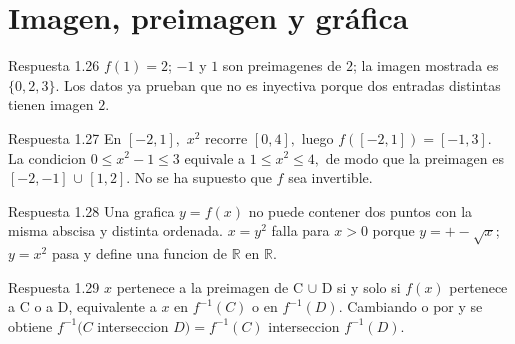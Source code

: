 \documentclass[10pt,a4paper,oneside,openany]{book}
\begin{document}
\section{Imagen, preimagen y gráfica}
\begin{PSevenAnswerFixed}{Respuesta 1.26}
\(f(1)=2\); \(-1\) y \(1\) son preimagenes de \(2\); la imagen mostrada es \(\{0,2,3\}\). Los datos ya prueban que no es inyectiva porque dos entradas distintas tienen imagen \(2\).
\end{PSevenAnswerFixed}
\begin{PSevenAnswerFixed}{Respuesta 1.27}
En \([-2,1],\) \(x^{2}\) recorre \([0,4],\) luego \(f([-2,1])=[-1,3]\). La condicion \(0\le x^{2}-1\le 3\) equivale a \(1\le x^{2}\le 4,\) de modo que la preimagen es \([-2,-1]\) \(\cup \) \([1,2]\). No se ha supuesto que \(f\) sea invertible.
\end{PSevenAnswerFixed}
\begin{PSevenAnswerFixed}{Respuesta 1.28}
Una grafica \(y=f(x)\) no puede contener dos puntos con la misma abscisa y distinta ordenada. \(x=y^{2}\) falla para \(x>0\) porque \(y=+-\sqrt{x}\); \(y=x^{2}\) pasa y define una funcion de \(\mathbb{R}\) en \(\mathbb{R}\).
\end{PSevenAnswerFixed}
\begin{PSevenAnswerFixed}{Respuesta 1.29}
\(x\) pertenece a la preimagen de C \(\cup \) D si y solo si \(f(x)\) pertenece a C o a D, equivalente a \(x\) en \(f^{-1}(C)\) o en \(f^{-1}(D)\). Cambiando o por y se obtiene \(f^{-1}(C\) interseccion \(D)=f^{-1}(C)\) interseccion \(f^{-1}(D)\).
\end{PSevenAnswerFixed}
\end{document}
